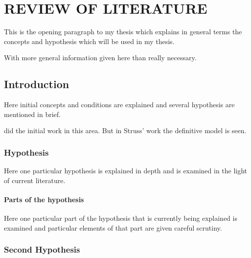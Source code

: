 \chapter{\MakeUppercase{Review of Literature}}

This is the opening paragraph to my thesis which
explains in general terms the concepts and hypothesis
which will be used in my thesis.

With more general information given here than really
necessary.

\section{Introduction}

Here initial concepts and conditions are explained and
several hypothesis are mentioned in brief.

did the initial work in this area. But in Struss' work \autocite{buiEveryGeneratingPolytope2023}
the definitive model is seen.

\subsection{Hypothesis}

Here one particular hypothesis is explained in depth
and is examined in the light of current literature.

\subsubsection{Parts of the hypothesis}

Here one particular part of the hypothesis that is
currently being explained is examined and particular
elements of that part are given careful scrutiny.


\subsection{Second Hypothesis}

